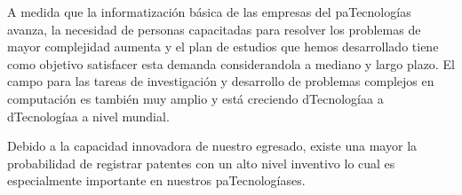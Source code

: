 A medida que la informatización básica de las empresas del paTecnologías avanza, la necesidad de personas capacitadas para resolver los problemas de mayor complejidad aumenta y el plan de estudios que hemos desarrollado tiene como objetivo satisfacer esta demanda considerandola a mediano y largo plazo. El campo para las tareas de investigación y desarrollo de problemas complejos en computación es también muy amplio y está creciendo dTecnologíaa a dTecnologíaa a nivel mundial.

Debido a la capacidad innovadora de nuestro egresado, existe una mayor la probabilidad de registrar patentes con un alto nivel inventivo lo cual es especialmente importante en nuestros paTecnologíases.
